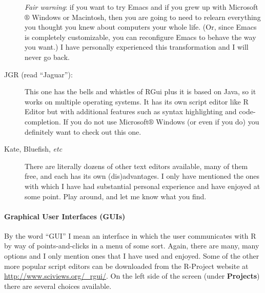 \documentclass[captions=tableheading]{scrbook}
\begin{document}
\begin{description}
     \emph{Fair warning}: if you want to try Emacs and if you grew up with Microsoft\(\circledR\) Windows or Macintosh, then you are going to need to relearn everything you thought you knew about computers your whole life. (Or, since Emacs is completely customizable, you can reconfigure Emacs to behave the way you want.) I have personally experienced this transformation and I will never go back.
\item[JGR (read ``Jaguar''):\index{JGR}] This one has the bells and whistles of \textsf{RGui} plus it is based on Java, so it works on multiple operating systems. It has its own script editor like \textsf{R} Editor but with additional features such as syntax highlighting and code-completion. If you do not use Microsoft\(\circledR\) Windows (or even if you do) you definitely want to check out this one.
\item[Kate, Bluefish, \emph{etc}] There are literally dozens of other text editors available, many of them free, and each has its own (dis)advantages. I only have mentioned the ones with which I have had substantial personal experience and have enjoyed at some point. Play around, and let me know what you find.
\end{description}

\paragraph*{Graphical User Interfaces (GUIs)}

By the word ``GUI'' I mean an interface in which the user communicates with \textsf{R} by way of points-and-clicks in a menu of some sort. Again, there are many, many options and I only mention ones that I have used and enjoyed. Some of the other more popular script editors can be downloaded from the \textsf{R}-Project website at \href{http://www.sciviews.org/_rgui/}{http://www.sciviews.org/\_rgui/}. On the left side of the screen (under \textbf{Projects}) there are several choices available. 
\end{document}
